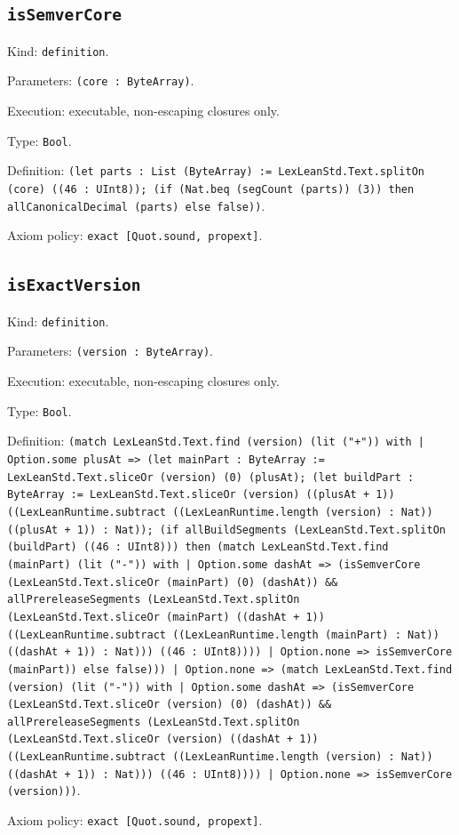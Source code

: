 \documentclass[11pt]{article}
\begin{document}
\subsection*{\texttt{isSemverCore}}
\noindent Kind: \texttt{definition}.\par
\noindent Parameters: \texttt{(core : ByteArray)}.\par
\noindent Execution: executable, non-escaping closures only.\par
\noindent Type: \texttt{Bool}.\par
\noindent Definition: \texttt{(let parts : List (ByteArray) := LexLeanStd.Text.splitOn (core) ((46 : UInt8)); (if (Nat.beq (segCount (parts)) (3)) then allCanonicalDecimal (parts) else false))}.\par
\noindent Axiom policy: \texttt{exact [Quot.sound, propext]}.\par
\subsection*{\texttt{isExactVersion}}
\noindent Kind: \texttt{definition}.\par
\noindent Parameters: \texttt{(version : ByteArray)}.\par
\noindent Execution: executable, non-escaping closures only.\par
\noindent Type: \texttt{Bool}.\par
\noindent Definition: \texttt{(match LexLeanStd.Text.find (version) (lit ("+")) with | Option.some plusAt => (let mainPart : ByteArray := LexLeanStd.Text.sliceOr (version) (0) (plusAt); (let buildPart : ByteArray := LexLeanStd.Text.sliceOr (version) ((plusAt + 1)) ((LexLeanRuntime.subtract ((LexLeanRuntime.length (version) : Nat)) ((plusAt + 1)) : Nat)); (if allBuildSegments (LexLeanStd.Text.splitOn (buildPart) ((46 : UInt8))) then (match LexLeanStd.Text.find (mainPart) (lit ("-")) with | Option.some dashAt => (isSemverCore (LexLeanStd.Text.sliceOr (mainPart) (0) (dashAt)) \&\& allPrereleaseSegments (LexLeanStd.Text.splitOn (LexLeanStd.Text.sliceOr (mainPart) ((dashAt + 1)) ((LexLeanRuntime.subtract ((LexLeanRuntime.length (mainPart) : Nat)) ((dashAt + 1)) : Nat))) ((46 : UInt8)))) | Option.none => isSemverCore (mainPart)) else false))) | Option.none => (match LexLeanStd.Text.find (version) (lit ("-")) with | Option.some dashAt => (isSemverCore (LexLeanStd.Text.sliceOr (version) (0) (dashAt)) \&\& allPrereleaseSegments (LexLeanStd.Text.splitOn (LexLeanStd.Text.sliceOr (version) ((dashAt + 1)) ((LexLeanRuntime.subtract ((LexLeanRuntime.length (version) : Nat)) ((dashAt + 1)) : Nat))) ((46 : UInt8)))) | Option.none => isSemverCore (version)))}.\par
\noindent Axiom policy: \texttt{exact [Quot.sound, propext]}.\par
\end{document}
